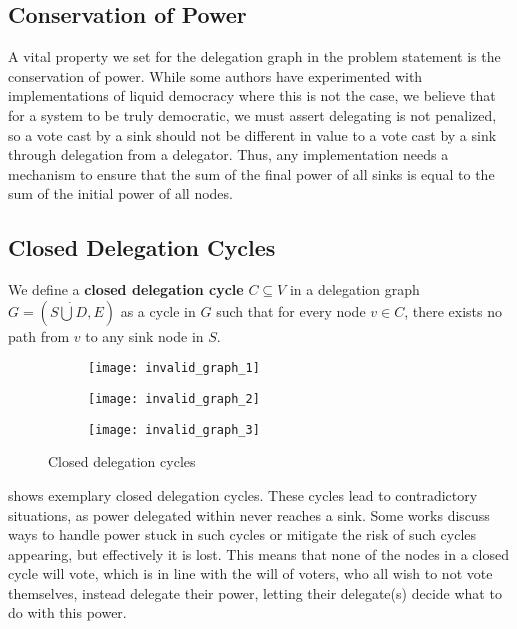  \subsection{Conservation of Power}
 
 A vital property we set for the delegation graph in the problem statement is the conservation of power. While some authors have experimented with implementations of liquid democracy where this is not the case, we believe that for a system to be truly democratic, we must assert delegating is not penalized, so a vote cast by a sink should not be different in value to a vote cast by a sink through delegation from a delegator. \cite{bersetcheGeneralizingLiquidDemocracy2022, boldiViscousDemocracySocial2011} Thus, any implementation needs a mechanism to ensure that the sum of the final power of all sinks is equal to the sum of the initial power of all nodes.

\subsection{Closed Delegation Cycles}

We define a \textbf{closed delegation cycle} $C \subseteq V$ in a delegation graph $G = (S \dot\bigcup D, E)$ as a cycle in $G$ such that for every node $v \in C$, there exists no path from $v$ to any sink node in $S$.

\begin{figure}[t]
    \centering
    \begin{subfigure}[t]{0.32\textwidth}
        \centering
        \texttt{[image: invalid\_graph\_1]}
    \end{subfigure}
    \hfill
    \begin{subfigure}[t]{0.32\textwidth}
        \centering
        \texttt{[image: invalid\_graph\_2]}
    \end{subfigure}
    \hfill
    \begin{subfigure}[t]{0.32\textwidth}
        \centering
        \texttt{[image: invalid\_graph\_3]}
    \end{subfigure}
    \caption{Closed delegation cycles}
    \label{fig:closed-delegation-cycles}
\end{figure}

 shows exemplary closed delegation cycles. These cycles lead to contradictory situations, as power delegated within never reaches a sink. Some works discuss ways to handle power stuck in such cycles or mitigate the risk of such cycles appearing, but effectively it is lost. \cite{behrensCircularDelegationsMyth2015, brillInteractiveDemocracy2018} This means that none of the nodes in a closed cycle will vote, which is in line with the will of voters, who all wish to not vote themselves, instead delegate their power, letting their delegate(s) decide what to do with this power. 

